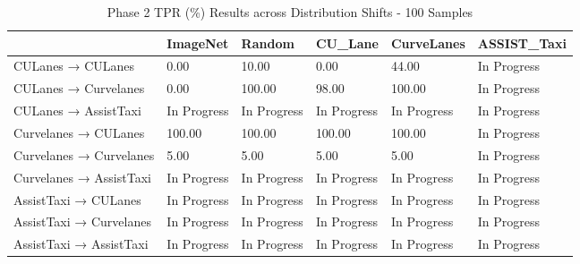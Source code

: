 \begin{table}
\caption{Phase 2 TPR (\%) Results across Distribution Shifts - 100 Samples}
\label{tab:phase2_tpr_100}
\begin{tabular}{llllll}
\toprule
 & ImageNet & Random & CU_Lane & CurveLanes & ASSIST_Taxi \\
\midrule
CULanes → CULanes & 0.00 & 10.00 & 0.00 & 44.00 & In Progress \\
CULanes → Curvelanes & 0.00 & 100.00 & 98.00 & 100.00 & In Progress \\
CULanes → AssistTaxi & In Progress & In Progress & In Progress & In Progress & In Progress \\
Curvelanes → CULanes & 100.00 & 100.00 & 100.00 & 100.00 & In Progress \\
Curvelanes → Curvelanes & 5.00 & 5.00 & 5.00 & 5.00 & In Progress \\
Curvelanes → AssistTaxi & In Progress & In Progress & In Progress & In Progress & In Progress \\
AssistTaxi → CULanes & In Progress & In Progress & In Progress & In Progress & In Progress \\
AssistTaxi → Curvelanes & In Progress & In Progress & In Progress & In Progress & In Progress \\
AssistTaxi → AssistTaxi & In Progress & In Progress & In Progress & In Progress & In Progress \\
\bottomrule
\end{tabular}
\end{table}
